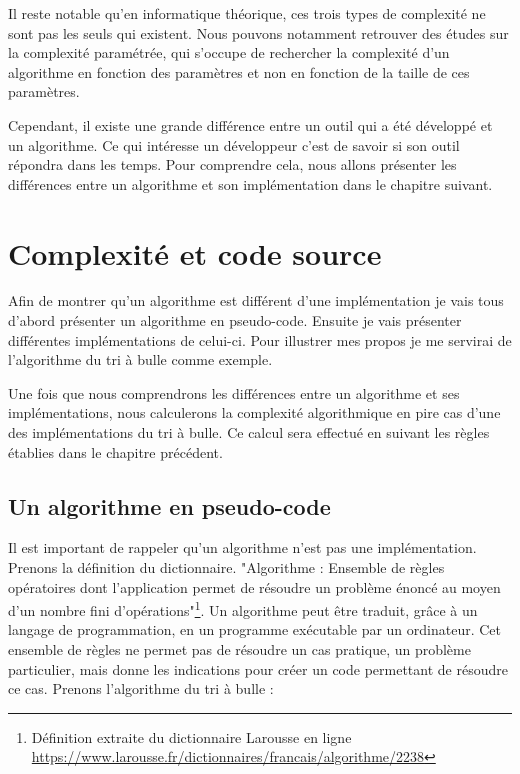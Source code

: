 \documentclass[12pt, twoside, openright]{report}
\begin{document}
Il reste notable qu'en informatique théorique, ces trois types de complexité ne sont pas les seuls qui existent. Nous pouvons notamment retrouver des études sur la complexité paramétrée, qui s'occupe de rechercher la complexité d'un algorithme en fonction des paramètres et non en fonction de la taille de ces paramètres. 

Cependant, il existe une grande différence entre un outil qui a été développé et un algorithme. Ce qui intéresse un développeur c'est de savoir si son outil répondra dans les temps. Pour comprendre cela, nous allons présenter les différences entre un algorithme et son implémentation dans le chapitre suivant.

\chapter{Complexité et code source}

Afin de montrer qu'un algorithme est différent d'une implémentation je vais tous d'abord présenter un algorithme en pseudo-code. Ensuite je vais présenter différentes implémentations de celui-ci. Pour illustrer mes propos je me servirai de l'algorithme du tri à bulle comme exemple. 

Une fois que nous comprendrons les différences entre un algorithme et ses implémentations, nous calculerons la complexité algorithmique en pire cas d'une des implémentations du tri à bulle. Ce calcul sera effectué en suivant les règles établies dans le chapitre précédent.

\section{Un algorithme en pseudo-code}

Il est important de rappeler qu'un algorithme n'est pas une implémentation. Prenons la définition du dictionnaire. "Algorithme : Ensemble de règles opératoires dont l'application permet de résoudre un problème énoncé au moyen d'un nombre fini d'opérations"\footnote{Définition extraite du dictionnaire Larousse en ligne  \url{https://www.larousse.fr/dictionnaires/francais/algorithme/2238}}. Un algorithme peut être traduit, grâce à un langage de programmation, en un programme exécutable par un ordinateur. Cet ensemble de règles ne permet pas de résoudre un cas pratique, un problème particulier, mais donne les indications pour créer un code permettant de résoudre ce cas. Prenons l'algorithme du tri à bulle : 

\vspace{0.4cm}
\end{document}
